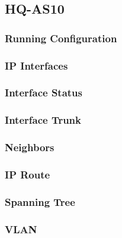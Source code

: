 \subsection{HQ-AS10}
\subsubsection{Running Configuration}


\subsubsection{IP Interfaces}


\subsubsection{Interface Status}


\subsubsection{Interface Trunk}


\subsubsection{Neighbors}


\subsubsection{IP Route}


\subsubsection{Spanning Tree}


\subsubsection{VLAN}




